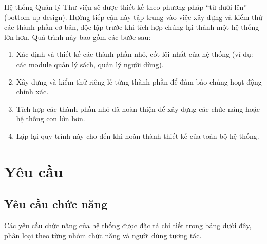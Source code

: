 Hệ thống Quản lý Thư viện sẽ được thiết kế theo phương pháp ``từ dưới lên'' (bottom-up design). Hướng tiếp cận này tập trung vào việc xây dựng và kiểm thử các thành phần cơ bản, độc lập trước khi tích hợp chúng lại thành một hệ thống lớn hơn. Quá trình này bao gồm các bước sau:
\begin{enumerate}
    \item Xác định và thiết kế các thành phần nhỏ, cốt lõi nhất của hệ thống (ví dụ: các module quản lý sách, quản lý người dùng).
    \item Xây dựng và kiểm thử riêng lẻ từng thành phần để đảm bảo chúng hoạt động chính xác.
    \item Tích hợp các thành phần nhỏ đã hoàn thiện để xây dựng các chức năng hoặc hệ thống con lớn hơn.
    \item Lặp lại quy trình này cho đến khi hoàn thành thiết kế của toàn bộ hệ thống.
\end{enumerate}
\newpage
\section{Yêu cầu}
\label{sec:YeuCau}

\subsection{Yêu cầu chức năng}
\label{subsec:YeuCauChucNang}
Các yêu cầu chức năng của hệ thống được đặc tả chi tiết trong bảng dưới đây, phân loại theo từng nhóm chức năng và người dùng tương tác.


